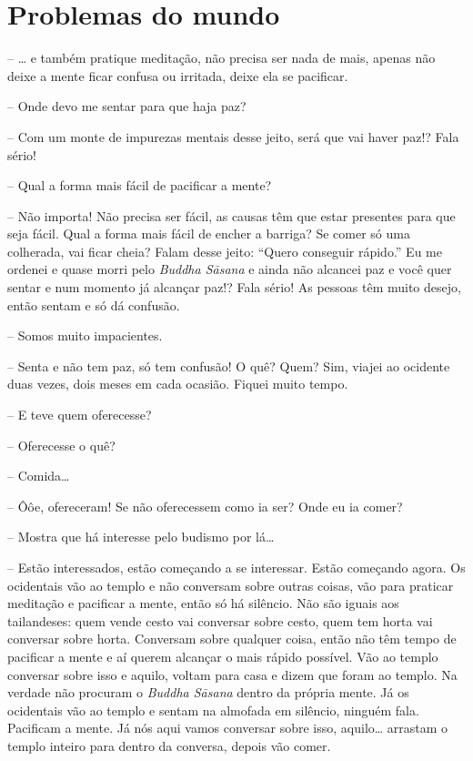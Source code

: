 
\chapter{Problemas do mundo}
\markright{\theChapterAuthor}

-- \ldots{} e também pratique meditação, não precisa ser nada de mais,
apenas não deixe a mente ficar confusa ou irritada, deixe ela se
pacificar.

-- Onde devo me sentar para que haja paz?

-- Com um monte de impurezas mentais desse jeito, será que vai
haver paz!? Fala sério!

-- Qual a forma mais fácil de pacificar a mente?

-- Não importa! Não precisa ser fácil, as causas têm que estar
presentes para que seja fácil. Qual a forma mais fácil de encher a
barriga? Se comer só uma colherada, vai ficar cheia? Falam desse jeito:
“Quero conseguir rápido.” Eu me ordenei e quase morri pelo
\emph{Buddha Sāsana} e ainda não alcancei paz e você quer sentar e
num momento já alcançar paz!? Fala sério! As pessoas têm muito desejo,
então sentam e só dá confusão.

-- Somos muito impacientes.

-- Senta e não tem paz, só tem confusão! O quê? Quem? Sim, viajei
ao ocidente duas vezes, dois meses em cada ocasião. Fiquei muito tempo.

-- E teve quem oferecesse?

-- Oferecesse o quê?

-- Comida\ldots{}

-- Ôôe, ofereceram! Se não oferecessem como ia ser? Onde eu ia
comer?

-- Mostra que há interesse pelo budismo por lá\ldots{}

-- Estão interessados, estão começando a se interessar. Estão
começando agora. Os ocidentais vão ao templo e não conversam sobre
outras coisas, vão para praticar meditação e pacificar a mente, então
só há silêncio. Não são iguais aos tailandeses: quem vende cesto vai
conversar sobre cesto, quem tem horta vai conversar sobre horta.
Conversam sobre qualquer coisa, então não têm tempo de pacificar a
mente e aí querem alcançar o mais rápido possível. Vão ao templo
conversar sobre isso e aquilo, voltam para casa e dizem que foram ao
templo. Na verdade não procuram o \emph{Buddha Sāsana} dentro da
própria mente. Já os ocidentais vão ao templo e sentam na almofada em
silêncio, ninguém fala. Pacificam a mente. Já nós aqui vamos conversar
sobre isso, aquilo\ldots{} arrastam o templo inteiro para dentro da conversa,
depois vão comer.

